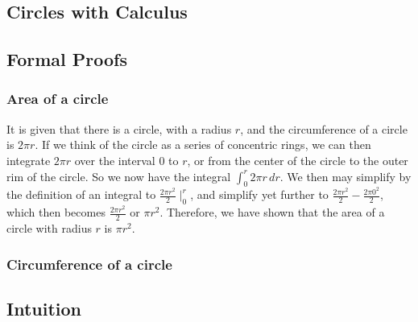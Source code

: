 \documentclass[12pt]{article}
\begin{document}






\begin{appendices}
\section{Circles with Calculus}
\subsection{Formal Proofs}
\subsubsection{Area of a circle}
It is given that there is a circle, with a radius $r$, and the circumference of a circle is $2\pi r$. If we think of the circle as a series of concentric rings, we can then integrate $2\pi r$ over the interval $0$ to $r$, or from the center of the circle to the outer rim of the circle. So we now have the integral $\int^r_0 2\pi r\, dr$. We then may simplify by the definition of an integral to $\frac{2\pi r^2}{2}\mid^r_0$, and simplify yet further to $\frac{2\pi r^2}{2}-\frac{2\pi 0^2}{2}$, which then becomes $\frac{2\pi r^2}{2}$ or $\pi r^2$. Therefore, we have shown that the area of a circle with radius $r$ is $\pi r^2$.
\subsubsection{Circumference of a circle}
\subsection{Intuition}

\end{appendices}
\end{document}
